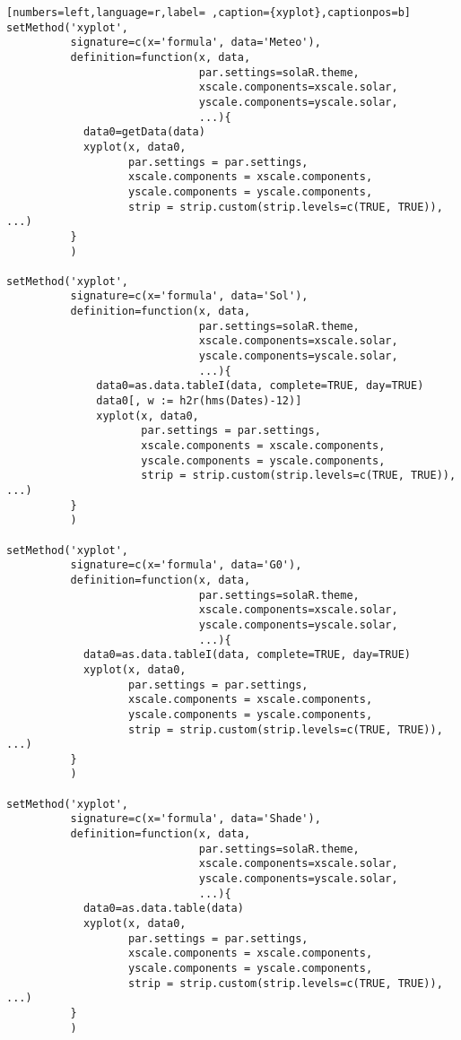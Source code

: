\begin{lstlisting}[numbers=left,language=r,label= ,caption={xyplot},captionpos=b]
setMethod('xyplot',
          signature=c(x='formula', data='Meteo'),
          definition=function(x, data,
                              par.settings=solaR.theme,
                              xscale.components=xscale.solar,
                              yscale.components=yscale.solar,
                              ...){
            data0=getData(data)
            xyplot(x, data0,
                   par.settings = par.settings,
                   xscale.components = xscale.components,
                   yscale.components = yscale.components,
                   strip = strip.custom(strip.levels=c(TRUE, TRUE)), ...)
          }
          )

setMethod('xyplot',
          signature=c(x='formula', data='Sol'),
          definition=function(x, data,
                              par.settings=solaR.theme,
                              xscale.components=xscale.solar,
                              yscale.components=yscale.solar,
                              ...){
              data0=as.data.tableI(data, complete=TRUE, day=TRUE)
              data0[, w := h2r(hms(Dates)-12)]
              xyplot(x, data0,
                     par.settings = par.settings,
                     xscale.components = xscale.components,
                     yscale.components = yscale.components,
                     strip = strip.custom(strip.levels=c(TRUE, TRUE)), ...)
          }
          )

setMethod('xyplot',
          signature=c(x='formula', data='G0'),
          definition=function(x, data,
                              par.settings=solaR.theme,
                              xscale.components=xscale.solar,
                              yscale.components=yscale.solar,
                              ...){
            data0=as.data.tableI(data, complete=TRUE, day=TRUE)
            xyplot(x, data0,
                   par.settings = par.settings,
                   xscale.components = xscale.components,
                   yscale.components = yscale.components,
                   strip = strip.custom(strip.levels=c(TRUE, TRUE)), ...)
          }
          )

setMethod('xyplot',
          signature=c(x='formula', data='Shade'),
          definition=function(x, data,
                              par.settings=solaR.theme,
                              xscale.components=xscale.solar,
                              yscale.components=yscale.solar,
                              ...){
            data0=as.data.table(data)
            xyplot(x, data0,
                   par.settings = par.settings,
                   xscale.components = xscale.components,
                   yscale.components = yscale.components,
                   strip = strip.custom(strip.levels=c(TRUE, TRUE)), ...)
          }
          )


\end{lstlisting}
